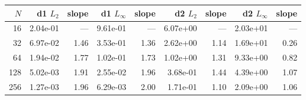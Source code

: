 \begin{tabular}{rrrrrrrrr}
\toprule
$N$ & d1 $L_2$ & slope & d1 $L_\infty$ & slope & d2 $L_2$ & slope & d2 $L_\infty$ & slope \\
\midrule
16 & 2.04e-01 & --- & 9.61e-01 & --- & 6.07e+00 & --- & 2.03e+01 & --- \\
32 & 6.97e-02 & 1.46 & 3.53e-01 & 1.36 & 2.62e+00 & 1.14 & 1.69e+01 & 0.26 \\
64 & 1.94e-02 & 1.77 & 1.02e-01 & 1.73 & 1.02e+00 & 1.31 & 9.33e+00 & 0.82 \\
128 & 5.02e-03 & 1.91 & 2.55e-02 & 1.96 & 3.68e-01 & 1.44 & 4.39e+00 & 1.07 \\
256 & 1.27e-03 & 1.96 & 6.29e-03 & 2.00 & 1.71e-01 & 1.10 & 2.09e+00 & 1.06 \\
\bottomrule
\end{tabular}
